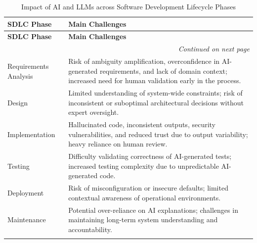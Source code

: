 {\small
\begin{longtable}{p{2.3cm} p{11.5cm}}
\caption{Impact of AI and LLMs across Software Development Lifecycle Phases}
\label{tab:ai_sdlc_mapping} \\

\toprule
\textbf{SDLC Phase} & \textbf{Main Challenges} \\
\midrule
\endfirsthead

\toprule
\textbf{SDLC Phase} & \textbf{Main Challenges} \\
\midrule
\endhead

\midrule
\multicolumn{2}{r}{\textit{Continued on next page}}\\
\bottomrule
\endfoot

\bottomrule
\endlastfoot

Requirements Analysis &
Risk of ambiguity amplification, overconfidence in AI-generated requirements, and lack of domain context; increased need for human validation early in the process. \\
\addlinespace

Design &
Limited understanding of system-wide constraints; risk of inconsistent or suboptimal architectural decisions without expert oversight. \\
\addlinespace

Implementation &
Hallucinated code, inconsistent outputs, security vulnerabilities, and reduced trust due to output variability; heavy reliance on human review. \\
\addlinespace

Testing &
Difficulty validating correctness of AI-generated tests; increased testing complexity due to unpredictable AI-generated code. \\
\addlinespace

Deployment &
Risk of misconfiguration or insecure defaults; limited contextual awareness of operational environments. \\
\addlinespace

Maintenance &
Potential over-reliance on AI explanations; challenges in maintaining long-term system understanding and accountability. \\
\addlinespace

\end{longtable}
}




